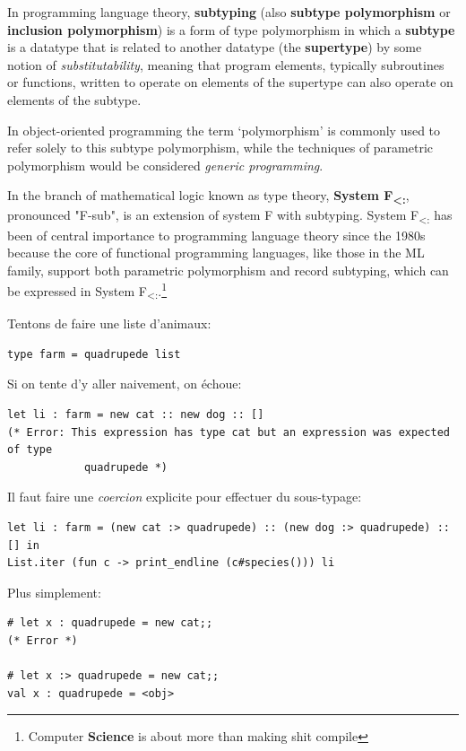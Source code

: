 \documentclass[a4paper]{article}
\begin{document}
In programming language theory, \textbf{subtyping} (also \textbf{subtype
polymorphism} or
\textbf{inclusion polymorphism}) is a form of type polymorphism in which a
\textbf{subtype} is a
datatype that is related to another datatype (the \textbf{supertype}) by some
notion of \textit{substitutability}, meaning that program elements, typically
subroutines or functions, written to operate on elements of the supertype can
also operate on elements of the subtype.

In object-oriented programming the term `polymorphism' is commonly used to
refer solely to this subtype polymorphism, while the techniques of parametric
polymorphism would be considered \textit{generic programming}.

In the branch of mathematical logic known as type theory, \textbf{System
F\textsubscript{<:}},
pronounced "F-sub", is an extension of system F with subtyping. System
F\textsubscript{<:} has
been of central importance to programming language theory since the 1980s
because the core of functional programming languages, like those in the ML
family, support both parametric polymorphism and record subtyping, which can be
expressed in System F\textsubscript{<:}.\footnote{Computer \textbf{Science} is
about more than making shit compile}

\newpage

Tentons de faire une liste d'animaux:

\begin{verbatim}
type farm = quadrupede list
\end{verbatim}

Si on tente d'y aller naivement, on échoue:

\begin{verbatim}
let li : farm = new cat :: new dog :: []
(* Error: This expression has type cat but an expression was expected of type
            quadrupede *)
\end{verbatim}

Il faut faire une \textit{coercion} explicite pour effectuer du sous-typage:

\begin{verbatim}
let li : farm = (new cat :> quadrupede) :: (new dog :> quadrupede) :: [] in
List.iter (fun c -> print_endline (c#species())) li
\end{verbatim}

Plus simplement:

\begin{verbatim}
# let x : quadrupede = new cat;;
(* Error *)

# let x :> quadrupede = new cat;;
val x : quadrupede = <obj>
\end{verbatim}
\end{document}
